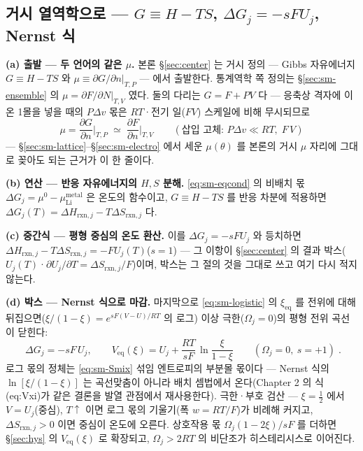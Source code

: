 \documentclass[11pt,a4paper]{article}
\newcommand{\eq}{\mathrm{eq}}
\newcommand{\rxn}{\mathrm{rxn}}
\begin{document}
\subsection{거시 열역학으로 --- $G\equiv H-TS$, $\Delta G_j=-sFU_j$, Nernst 식}\label{sec:sm-macro}
\textbf{(a) 출발 --- 두 언어의 같은 $\mu$.} 본론 \S\ref{sec:center} 는 거시 정의 --- Gibbs 자유에너지
$G\equiv H-TS$ 와 $\mu\equiv\partial G/\partial n|_{T,P}$ --- 에서 출발한다. 통계역학 쪽 정의는
\S\ref{sec:sm-ensemble} 의 $\mu=\partial F/\partial N|_{T,V}$ 였다. 둘의 다리는 $G=F+PV$ 다 --- 응축상
격자에 이온 1몰을 넣을 때의 $P\Delta v$ 몫은 $RT$·전기 일($FV$) 스케일에 비해 무시되므로
\begin{equation}
\mu=\frac{\partial G}{\partial n}\Big|_{T,P}\;\simeq\;\frac{\partial F}{\partial n}\Big|_{T,V}
\qquad(\text{삽입 고체: }P\Delta v\ll RT,\;F\,V)
\label{eq:sm-mubridge}
\end{equation}
--- \S\ref{sec:sm-lattice}--\S\ref{sec:sm-electro} 에서 세운 $\mu(\theta)$ 를 본론의 거시 $\mu$ 자리에
그대로 꽂아도 되는 근거가 이 한 줄이다.

\textbf{(b) 연산 --- 반응 자유에너지의 $H,S$ 분해.} \eqref{eq:sm-eqcond} 의 비배치 몫
$\Delta G_j=\mu^0-\mu_\mathrm{Li}^\mathrm{metal}$ 은 온도의 함수이고, $G\equiv H-TS$ 를 반응 차분에 적용하면
$\Delta G_j(T)=\Delta H_{\rxn,j}-T\Delta S_{\rxn,j}$ 다.

\textbf{(c) 중간식 --- 평형 중심의 온도 환산.}
이를 $\Delta G_j=-sFU_j$ 와 등치하면 $\Delta H_{\rxn,j}-T\Delta S_{\rxn,j}=-FU_j(T)$($s{=}1$) --- 그 이항이
\S\ref{sec:center} 의 결과 박스($U_j(T)$·$\partial U_j/\partial T=\Delta S_{\rxn,j}/F$)이며, 박스는 그 절의
것을 그대로 쓰고 여기 다시 적지 않는다.

\textbf{(d) 박스 --- Nernst 식으로 마감.} 마지막으로 \eqref{eq:sm-logistic} 의 $\xi_\eq$ 를 전위에 대해
뒤집으면($\xi/(1-\xi)=e^{sF(V-U)/RT}$ 의 로그) 이상 극한($\Omega_j=0$)의 평형 전위 곡선이 닫힌다:
\begin{equation}
\boxed{\;
\Delta G_j=-sF\,U_j,
\qquad
V_\eq(\xi)=U_j+\frac{RT}{sF}\,\ln\frac{\xi}{1-\xi}
\qquad(\Omega_j=0,\ s=+1)\;.}
\label{eq:sm-nernst}
\end{equation}
로그 몫의 정체는 \eqref{eq:sm-Smix} 섞임 엔트로피의 부분몰 몫이다 --- Nernst 식의 $\ln[\xi/(1-\xi)]$ 는
곡선맞춤이 아니라 배치 셈법에서 온다(Chapter 2 의 식 (eq:Vxi)가 같은 결론을 발열 관점에서 재사용한다).
극한·부호 검산 --- $\xi=\tfrac12$ 에서 $V=U_j$(중심), $T\!\uparrow$ 이면 로그 몫의 기울기(폭 $w=RT/F$)가
비례해 커지고, $\Delta S_{\rxn,j}>0$ 이면 중심이 온도에 오른다. 상호작용 몫 $\Omega_j(1-2\xi)/sF$ 를 더하면
\S\ref{sec:hys} 의 $V_\eq(\xi)$ 로 확장되고, $\Omega_j>2RT$ 의 비단조가 히스테리시스로 이어진다.
\end{document}
